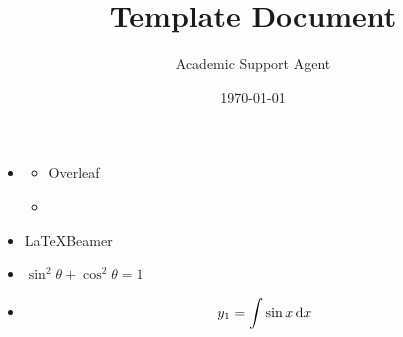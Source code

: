 \documentclass{article}
\title{Template Document}
\author{Academic Support Agent}
\date{\today}
\begin{document}
\maketitle


\begin{frame}
\titlepage
\end{frame}				%

\begin{frame}{ } %
%


\end{frame}

\AtBeginSection[]
{
  \begin{frame}
    \frametitle{ }
    
  \end{frame}
}



\section{ }%

\begin{frame}
  \frametitle{ }

  \begin{itemize}
    \item { }
	    \begin{itemize}
	    	\item    Overleaf
	    	\item   \XeLaTeX  
	    \end{itemize}
    \item   \LaTeX   Beamer   
    
    \item   $\sin^2 \theta + \cos^2 \theta = 1$
    \item {  \begin{equation}
	    y_{1}=\int \sin x\, {\rm d}x
    \end{equation}	 }   
  \end{itemize}
\end{frame}
\end{document}
